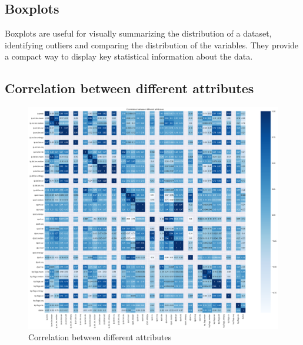 \subsection{Boxplots}
Boxplots are useful for visually summarizing the distribution of a dataset, identifying outliers and comparing the distribution of the variables. They provide a compact way to display key statistical information about the data.

\subsection{Correlation between different attributes}
\begin{figure}[h]
	\centering
	\includegraphics[width=1\textwidth]{./assets/images/correlation.png}
	\caption{Correlation between different attributes}
\end{figure}


